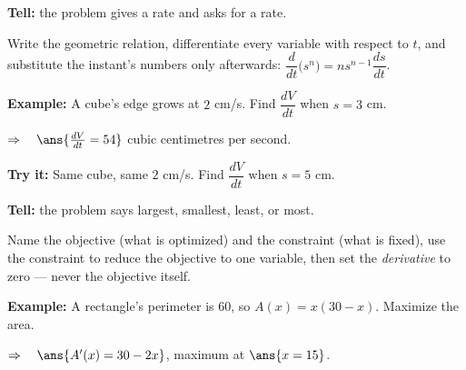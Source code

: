 \documentclass[12pt]{article}
\begin{document}


\begin{formulabox}
\textbf{Tell:} the problem gives a rate and asks for a rate.\par
Write the geometric relation, differentiate every variable with respect to $t$,
and substitute the instant's numbers only afterwards:
$\dfrac{d}{dt}\big(s^n\big) = ns^{n-1}\dfrac{ds}{dt}$.
\end{formulabox}

\begin{examplebox}
\textbf{Example:} \quad A cube's edge grows at $2$ cm/s. Find $\dfrac{dV}{dt}$
when $s = 3$ cm.

$\Rightarrow\quad \ans{\frac{dV}{dt} = 54}$ cubic centimetres per second.
\end{examplebox}

\begin{tryitbox}
\textbf{Try it:} \quad Same cube, same $2$ cm/s. Find $\dfrac{dV}{dt}$ when
$s = 5$ cm.\\[2pt]
\end{tryitbox}


\begin{formulabox}
\textbf{Tell:} the problem says largest, smallest, least, or most.\par
Name the objective (what is optimized) and the constraint (what is fixed), use
the constraint to reduce the objective to one variable, then set the
\emph{derivative} to zero --- never the objective itself.
\end{formulabox}

\begin{examplebox}
\textbf{Example:} \quad A rectangle's perimeter is $60$, so $A(x) = x(30 - x)$.
Maximize the area.

$\Rightarrow\quad \ans{A'(x) = 30 - 2x}$, \quad maximum at $\ans{x = 15}$.
\end{examplebox}
\end{document}
